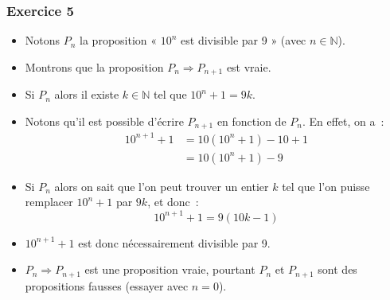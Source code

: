 \documentclass[10pt,notheorems]{beamer}
\theoremstyle{plain}
\theoremstyle{definition} %
\begin{document}
\begin{frame}
  \frametitle{Exercice 5}
  \fontsize{8}{10}\selectfont

  \begin{itemize}

  \item Notons $P_n$ la proposition « $10^n$ est divisible par 9 » (avec $n\in\mathbb N$).\newline

  \item Montrons que la proposition $P_n \Rightarrow P_{n+1}$ est vraie.\newline

  \item Si $P_n$ alors il existe $k\in \mathbb N$ tel que $10^n+1 = 9k$.\newline

  \item Notons qu'il est possible d'écrire $P_{n+1}$ en fonction de $P_n$. En effet, on a~:
    \[
      \begin{split}
        10^{n+1}+1 &= 10\left(10^n+1\right)-10+1\\
        &= 10\left(10^n+1\right)-9
      \end{split}
    \]
  \item Si $P_n$ alors on sait que l'on peut trouver un entier $k$ tel que l'on puisse remplacer $10^n+1$ par $9k$, et donc~:
    \[
      10^{n+1}+1 = 9 (10k-1)
    \]
  
  \item $10^{n+1}+1$ est donc nécessairement divisible par 9.\newline

  \item[\textdbend] $P_n \Rightarrow P_{n+1}$ est une proposition vraie, pourtant $P_n$ et $P_{n+1}$ sont des propositions fausses (essayer avec $n=0$).
    
  \end{itemize}
  
\end{frame}
\end{document}
